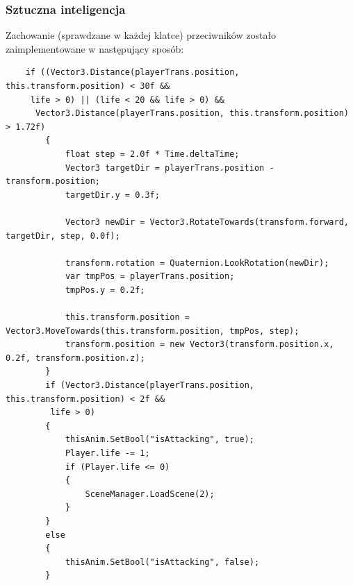 \documentclass[12pt,a4paper]{article}
\begin{document}
	\subsubsection*{Sztuczna inteligencja} 
	Zachowanie (sprawdzane w każdej klatce) przeciwników zostało zaimplementowane w następujący sposób:
	\begin{verbatim}
	if ((Vector3.Distance(playerTrans.position, this.transform.position) < 30f &&
	 life > 0) || (life < 20 && life > 0) &&
	  Vector3.Distance(playerTrans.position, this.transform.position) > 1.72f)
        {
            float step = 2.0f * Time.deltaTime;
            Vector3 targetDir = playerTrans.position - transform.position;
            targetDir.y = 0.3f;

            Vector3 newDir = Vector3.RotateTowards(transform.forward, targetDir, step, 0.0f);

            transform.rotation = Quaternion.LookRotation(newDir);
            var tmpPos = playerTrans.position;
            tmpPos.y = 0.2f;

            this.transform.position = Vector3.MoveTowards(this.transform.position, tmpPos, step);
            transform.position = new Vector3(transform.position.x, 0.2f, transform.position.z);
        }
        if (Vector3.Distance(playerTrans.position, this.transform.position) < 2f &&
         life > 0)
        {
            thisAnim.SetBool("isAttacking", true);
            Player.life -= 1;
            if (Player.life <= 0)
            {
                SceneManager.LoadScene(2);
            }
        }
        else
        {
            thisAnim.SetBool("isAttacking", false);
        }
	\end{verbatim}
	
\end{document}
